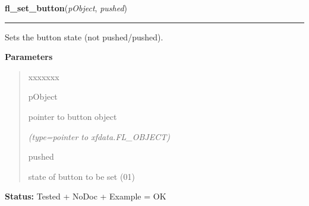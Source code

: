 \hspace{.8\funcindent}\begin{boxedminipage}{\funcwidth}

    \raggedright \textbf{fl\_set\_button}(\textit{pObject}, \textit{pushed})

    \vspace{-1.5ex}

    \rule{\textwidth}{0.5\fboxrule}
\setlength{\parskip}{2ex}
    Sets the button state (not pushed/pushed).

\setlength{\parskip}{1ex}
      \textbf{Parameters}
      \vspace{-1ex}

      \begin{quote}
        \begin{Ventry}{xxxxxxx}

          \item[pObject]

          pointer to button object

            {\it (type=pointer to xfdata.FL\_OBJECT)}

          \item[pushed]

          state of button to be set (0{\textbar}1)

        \end{Ventry}

      \end{quote}

\textbf{Status:} Tested + NoDoc + Example = OK



    \end{boxedminipage}

    \label{xformslib:library:fl_get_button_numb}

    \vspace{0.5ex}

